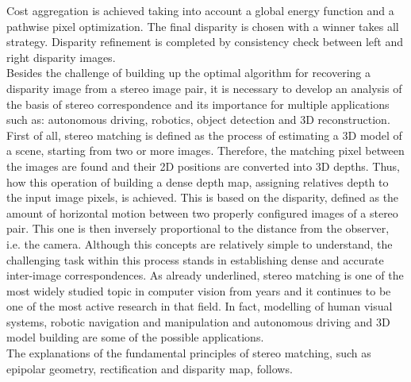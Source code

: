 Cost aggregation is achieved taking into account a global energy function and a pathwise pixel optimization. 
The final disparity is chosen with a winner takes all strategy. 
Disparity refinement is completed by consistency check between left and right disparity images. \\
Besides the challenge of building up the optimal algorithm for recovering a disparity image from a stereo image pair, it is necessary to develop an analysis of the basis of stereo correspondence and its importance for multiple applications such as: autonomous driving, robotics, object detection and 3D reconstruction. \\
First of all, stereo matching is defined as the process of estimating a 3D model of a scene, starting from two or more images. 
Therefore, the matching pixel between the images are found and their 2D positions are converted into 3D depths. 
Thus, how this operation of building a dense depth map, assigning relatives depth to the input image pixels, is achieved. 
This is based on the disparity, defined as the amount of horizontal motion between two properly configured images of a stereo pair. 
This one is then inversely proportional to the distance from the observer, i.e. the camera. 
Although this concepts are relatively simple to understand, the challenging task within this process stands in establishing dense and accurate inter-image correspondences\citep{Szeliski2011}.
As already underlined, stereo matching is one of the most widely studied topic in computer vision from years and it continues to be one of the most active research in that field. 
In fact, modelling of human visual systems, robotic navigation and manipulation and autonomous driving \citep{Poggi2019} and 3D model building are some of the possible applications.\\
The explanations of the fundamental principles of stereo matching, such as epipolar geometry, rectification and disparity map, follows.\\

